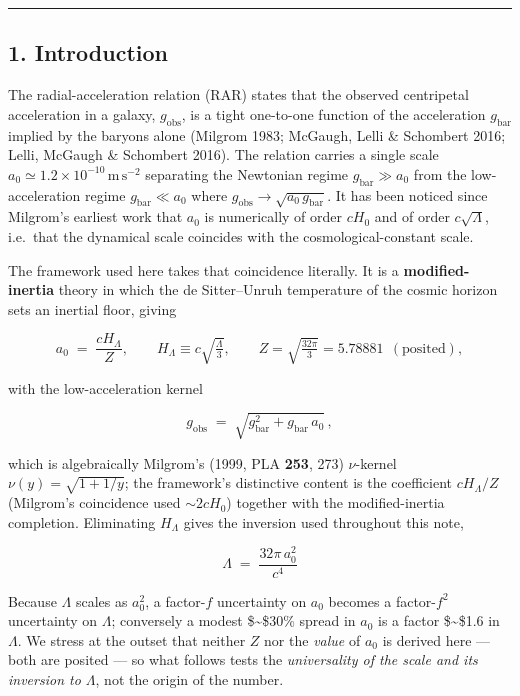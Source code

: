 \documentclass[
]{article}
\begin{document}
\begin{center}\rule{0.5\linewidth}{0.5pt}\end{center}

\subsection{1. Introduction}\label{introduction}

The radial-acceleration relation (RAR) states that the observed
centripetal acceleration in a galaxy, \(g_\mathrm{obs}\), is a tight
one-to-one function of the acceleration \(g_\mathrm{bar}\) implied by the
baryons alone (Milgrom 1983; McGaugh, Lelli \& Schombert 2016; Lelli,
McGaugh \& Schombert 2016). The relation carries a single scale
\(a_0\simeq1.2\times10^{-10}\,\mathrm{m\,s^{-2}}\) separating the
Newtonian regime \(g_\mathrm{bar}\gg a_0\) from the low-acceleration regime
\(g_\mathrm{bar}\ll a_0\) where \(g_\mathrm{obs}\to\sqrt{a_0\,g_\mathrm{bar}}\).
It has been noticed since Milgrom's earliest work that \(a_0\) is
numerically of order \(cH_0\) and of order \(c\sqrt{\Lambda}\),
i.e.~that the dynamical scale coincides with the cosmological-constant
scale.

The framework used here takes that coincidence literally. It is a
\textbf{modified-inertia} theory in which the de Sitter--Unruh
temperature of the cosmic horizon sets an inertial floor, giving

\[
a_0 \;=\; \frac{cH_\Lambda}{Z}, \qquad H_\Lambda \equiv c\sqrt{\tfrac{\Lambda}{3}}, \qquad Z=\sqrt{\tfrac{32\pi}{3}} = 5.78881 \ \ (\text{posited}),
\]

with the low-acceleration kernel

\[
g_\mathrm{obs} \;=\; \sqrt{g_\mathrm{bar}^2 + g_\mathrm{bar}\,a_0}\,,
\]

which is algebraically Milgrom's (1999, PLA \textbf{253}, 273)
\(\nu\)-kernel \(\nu(y)=\sqrt{1+1/y}\); the framework's distinctive
content is the coefficient \(cH_\Lambda/Z\) (Milgrom's coincidence used
\(\sim 2cH_0\)) together with the modified-inertia completion.
Eliminating \(H_\Lambda\) gives the inversion used throughout this note,

\[
\boxed{\;\Lambda \;=\; \frac{32\pi\,a_0^2}{c^4}\;}
\]

Because \(\Lambda\) scales as \(a_0^2\), a factor-\(f\) uncertainty on
\(a_0\) becomes a factor-\(f^2\) uncertainty on \(\Lambda\); conversely
a modest \$\sim\$30\% spread in \(a_0\) is a factor \$\sim\$1.6 in
\(\Lambda\). We stress at the outset that neither \(Z\) nor the
\emph{value} of \(a_0\) is derived here --- both are posited --- so what
follows tests the \emph{universality of the scale and its inversion to
\(\Lambda\)}, not the origin of the number.
\end{document}

